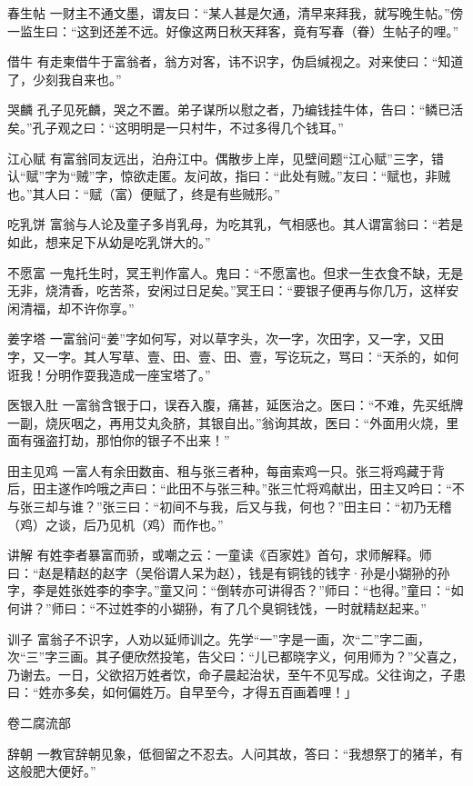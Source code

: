 \documentclass[12pt,UTF8]{ctexbook}
\begin{document}
春生帖
一财主不通文墨，谓友曰：“某人甚是欠通，清早来拜我，就写晚生帖。”傍一监生曰：“这到还差不远。好像这两日秋天拜客，竟有写春（眷）生帖子的哩。”

借牛
有走柬借牛于富翁者，翁方对客，讳不识字，伪启缄视之。对来使曰：“知道了，少刻我自来也。”

哭麟
孔子见死麟，哭之不置。弟子谋所以慰之者，乃编钱挂牛体，告曰：“鳞已活矣。”孔子观之曰：“这明明是一只村牛，不过多得几个钱耳。”

江心赋
有富翁同友远出，泊舟江中。偶散步上岸，见壁间题“江心赋”三字，错认“赋”字为“贼”字，惊欲走匿。友问故，指曰：“此处有贼。”友曰：“赋也，非贼也。”其人曰：“赋（富）便赋了，终是有些贼形。”

吃乳饼
富翁与人论及童子多肖乳母，为吃其乳，气相感也。其人谓富翁曰：“若是如此，想来足下从幼是吃乳饼大的。”

不愿富
一鬼托生时，冥王判作富人。鬼曰：“不愿富也。但求一生衣食不缺，无是无非，烧清香，吃苦茶，安闲过日足矣。”冥王曰：“要银子便再与你几万，这样安闲清福，却不许你享。”

姜字塔
一富翁问“姜”字如何写，对以草字头，次一字，次田字，又一字，又田字，又一字。其人写草、壹、田、壹、田、壹，写讫玩之，骂曰：“天杀的，如何诳我！分明作耍我造成一座宝塔了。”

医银入肚
一富翁含银于口，误吞入腹，痛甚，延医治之。医曰：“不难，先买纸牌一副，烧灰咽之，再用艾丸灸脐，其银自出。”翁询其故，医曰：“外面用火烧，里面有强盗打劫，那怕你的银子不出来！”

田主见鸡
一富人有余田数亩、租与张三者种，每亩索鸡一只。张三将鸡藏于背后，田主遂作吟哦之声曰：“此田不与张三种。”张三忙将鸡献出，田主又吟曰：“不与张三却与谁？”张三曰：“初间不与我，后又与我，何也？”田主曰：“初乃无稽（鸡）之谈，后乃见机（鸡）而作也。”

讲解
有姓李者暴富而骄，或嘲之云：一童读《百家姓》首句，求师解释。师曰：“赵是精赵的赵字（吴俗谓人呆为赵），钱是有铜钱的钱字·孙是小猢狲的孙字，李是姓张姓李的李字。”童又问：“倒转亦可讲得否？”师曰：“也得。”童曰：“如何讲？”师曰：“不过姓李的小猢狲，有了几个臭铜钱饯，一时就精赵起来。”

训子
富翁子不识字，人劝以延师训之。先学“一”字是一画，次“二”字二画，次“三”字三画。其子便欣然投笔，告父曰：“儿已都晓字义，何用师为？”父喜之，乃谢去。一日，父欲招万姓者饮，命子晨起治状，至午不见写成。父往询之，子患曰：“姓亦多矣，如何偏姓万。自早至今，才得五百画着哩！」

卷二腐流部

辞朝
一教官辞朝见象，低徊留之不忍去。人问其故，答曰：“我想祭丁的猪羊，有这般肥大便好。”
\end{document}
